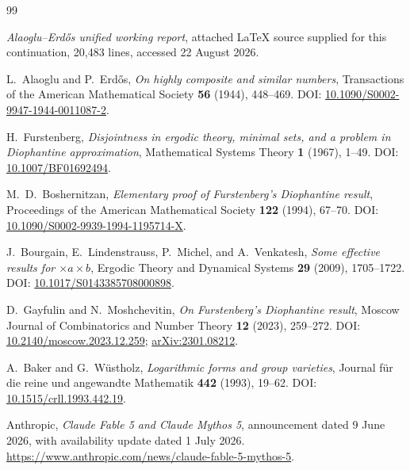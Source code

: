 \documentclass[11pt]{article}
\theoremstyle{definition}
\theoremstyle{remark}
\begin{document}
\begin{thebibliography}{99}

\emph{Alaoglu--Erd\H{o}s unified working report},
attached LaTeX source supplied for this continuation, 20,483 lines,
accessed 22 August 2026.

L.~Alaoglu and P.~Erd\H{o}s,
\newblock \emph{On highly composite and similar numbers},
\newblock Transactions of the American Mathematical Society \textbf{56} (1944),
448--469.
\newblock DOI:
\href{https://doi.org/10.1090/S0002-9947-1944-0011087-2}
{10.1090/S0002-9947-1944-0011087-2}.

H.~Furstenberg,
\newblock \emph{Disjointness in ergodic theory, minimal sets, and a problem in
Diophantine approximation},
\newblock Mathematical Systems Theory \textbf{1} (1967), 1--49.
\newblock DOI:
\href{https://doi.org/10.1007/BF01692494}{10.1007/BF01692494}.

M.~D.~Boshernitzan,
\newblock \emph{Elementary proof of Furstenberg's Diophantine result},
\newblock Proceedings of the American Mathematical Society \textbf{122} (1994),
67--70.
\newblock DOI:
\href{https://doi.org/10.1090/S0002-9939-1994-1195714-X}
{10.1090/S0002-9939-1994-1195714-X}.

J.~Bourgain, E.~Lindenstrauss, P.~Michel, and A.~Venkatesh,
\newblock \emph{Some effective results for $\times a\times b$},
\newblock Ergodic Theory and Dynamical Systems \textbf{29} (2009), 1705--1722.
\newblock DOI:
\href{https://doi.org/10.1017/S0143385708000898}
{10.1017/S0143385708000898}.

D.~Gayfulin and N.~Moshchevitin,
\newblock \emph{On Furstenberg's Diophantine result},
\newblock Moscow Journal of Combinatorics and Number Theory \textbf{12} (2023),
259--272.
\newblock DOI:
\href{https://doi.org/10.2140/moscow.2023.12.259}
{10.2140/moscow.2023.12.259};
\href{https://arxiv.org/abs/2301.08212}{arXiv:2301.08212}.

A.~Baker and G.~W\"ustholz,
\newblock \emph{Logarithmic forms and group varieties},
\newblock Journal f\"ur die reine und angewandte Mathematik \textbf{442} (1993),
19--62.
\newblock DOI:
\href{https://doi.org/10.1515/crll.1993.442.19}
{10.1515/crll.1993.442.19}.

Anthropic,
\newblock \emph{Claude Fable 5 and Claude Mythos 5},
\newblock announcement dated 9 June 2026, with availability update dated
1 July 2026.
\newblock \url{https://www.anthropic.com/news/claude-fable-5-mythos-5}.


\end{thebibliography}
\end{document}
